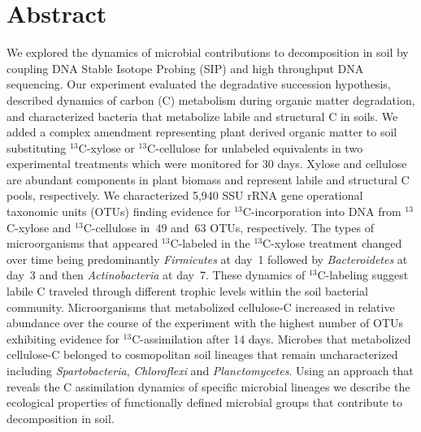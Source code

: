 \section{Abstract} We explored the dynamics of microbial contributions to
decomposition in soil by coupling DNA Stable Isotope Probing (SIP) and high
throughput DNA sequencing. Our experiment evaluated the degradative succession
hypothesis, described dynamics of carbon (C) metabolism during organic matter
degradation, and characterized bacteria that metabolize labile and structural
C in soils. We added a complex amendment representing plant derived organic
matter to soil substituting $^{13}$C-xylose or $^{13}$C-cellulose for unlabeled
equivalents in two experimental treatments which were monitored for 30 days.
Xylose and cellulose are abundant components in plant biomass and represent
labile and structural C pools, respectively. We characterized 5,940 SSU rRNA
gene operational taxonomic units (OTUs) finding evidence for
$^{13}$C-incorporation into DNA from $^{13}$C-xylose and $^{13}$C-cellulose
in~49 and~63 OTUs, respectively. The types of microorganisms that appeared
$^{13}$C-labeled in the $^{13}$C-xylose treatment changed over time being
predominantly \textit{Firmicutes} at day~1 followed by \textit{Bacteroidetes}
at day~3 and then \textit{Actinobacteria} at day~7.  These dynamics of
$^{13}$C-labeling suggest labile C traveled through different trophic levels
within the soil bacterial community. Microorganisms that metabolized
cellulose-C increased in relative abundance over the course of the experiment
with the highest number of OTUs exhibiting evidence for $^{13}$C-assimilation
after 14 days. Microbes that metabolized cellulose-C belonged to cosmopolitan
soil lineages that remain uncharacterized including \textit{Spartobacteria},
\textit{Chloroflexi} and \textit{Planctomycetes}.  Using an approach that
reveals the C assimilation dynamics of specific microbial lineages we describe
the ecological properties of functionally defined microbial groups that
contribute to decomposition in soil.
